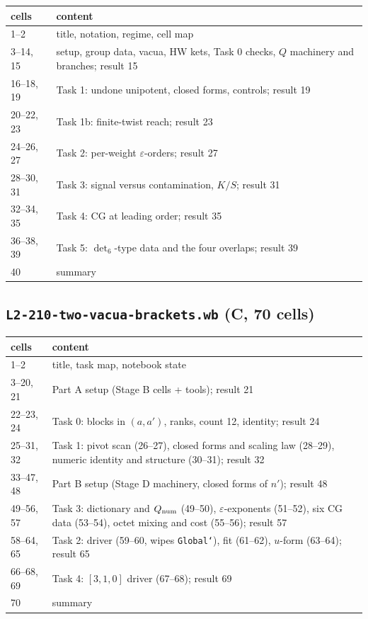 \documentclass[10pt]{article}
\begin{document}
\begin{center}\small\setlength{\tabcolsep}{3pt}\begin{longtable}{@{}lp{13cm}@{}}\toprule
\textbf{cells} & \textbf{content} \\\midrule\endhead
1--2 & title, notation, regime, cell map \\
3--14, 15 & setup, group data, vacua, HW kets, Task 0 checks, $Q$ machinery and branches; result 15 \\
16--18, 19 & Task 1: undone unipotent, closed forms, controls; result 19 \\
20--22, 23 & Task 1b: finite-twist reach; result 23 \\
24--26, 27 & Task 2: per-weight $\varepsilon$-orders; result 27 \\
28--30, 31 & Task 3: signal versus contamination, $K/S$; result 31 \\
32--34, 35 & Task 4: CG at leading order; result 35 \\
36--38, 39 & Task 5: $\det_6$-type data and the four overlaps; result 39 \\
40 & summary \\\bottomrule
\end{longtable}\end{center}

\subsection{\texttt{L2-210-two-vacua-brackets.wb} (C, 70 cells)}

\begin{center}\small\setlength{\tabcolsep}{3pt}\begin{longtable}{@{}lp{13cm}@{}}\toprule
\textbf{cells} & \textbf{content} \\\midrule\endhead
1--2 & title, task map, notebook state \\
3--20, 21 & Part A setup (Stage B cells + tools); result 21 \\
22--23, 24 & Task 0: blocks in $(a,a')$, ranks, count 12, identity; result 24 \\
25--31, 32 & Task 1: pivot scan (26--27), closed forms and scaling law (28--29), numeric identity and structure (30--31); result 32 \\
33--47, 48 & Part B setup (Stage D machinery, closed forms of $n'$); result 48 \\
49--56, 57 & Task 3: dictionary and $Q_{\rm num}$ (49--50), $\varepsilon$-exponents (51--52), six CG data (53--54), octet mixing and cost (55--56); result 57 \\
58--64, 65 & Task 2: driver (59--60, wipes \texttt{Global`}), fit (61--62), $u$-form (63--64); result 65 \\
66--68, 69 & Task 4: $[3,1,0]$ driver (67--68); result 69 \\
70 & summary \\\bottomrule
\end{longtable}\end{center}
\end{document}
